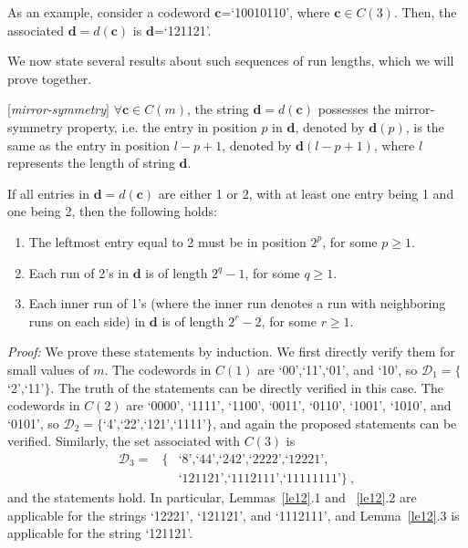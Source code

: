As an example, consider a codeword $\mathbf{c}$=`10010110', where
$\mathbf{c} \in C(3)$. Then, the associated
$\mathbf{d}=d(\mathbf{c})$ is $\mathbf{d}$=`121121'.

We now state several results about such
sequences of run lengths, which we will
prove together.

\begin{lemma}\label{le11} [\textit{mirror-symmetry}] $\forall \mathbf{c} \in C(m)$, the
string $\mathbf{d} = d(\mathbf{c})$
possesses the mirror-symmetry property, i.e.
the entry in position $p$ in $\mathbf{d}$, denoted by
$\mathbf{d}(p)$, is the same as the entry in position $l-p+1$,
denoted by $\mathbf{d}(l-p+1)$, where $l$ represents the length
of string $\mathbf{d}$.
\end{lemma}
\begin{lemma}\label{le12} If all entries in $\mathbf{d} = d(\mathbf{c})$ are either 1 or 2,
with at least one entry being 1 and one being 2, then the
following holds: \begin{enumerate} \item The leftmost entry equal
to 2 must be in position $2^p$, for some $p \geq 1$. \item Each
run of 2's in $\mathbf{d}$ is of length $2^q-1$, for some $q \geq
1$. \item Each inner run of 1's (where the inner run denotes a run
with neighboring runs on each side) in $\mathbf{d}$ is of length
$2^r-2$, for some $r \geq 1$.
\end{enumerate}
\end{lemma}
\noindent \textit{Proof:} We prove these statements by induction. We
first directly verify them for small values of $m$. The codewords in
$C(1)$ are `00',`11',`01', and `10', so
$\mathcal{D}_1=\{$`2',`11'$\}$. The truth of the statements can be
directly verified in this case. The codewords in $C(2)$ are `0000',
`1111', `1100', `0011', `0110', `1001', `1010', and `0101', so
\newline \noindent$\mathcal{D}_2=\{$`4',`22',`121',`1111'$\}$, and again the
proposed statements can be verified. Similarly, the set associated
with $C(3)$ is
\begin{eqnarray*}
\mathcal{D}_3=&\{&\text{`8',`44',`242',`2222',`12221'},\\
{}&{}&\text{`121121',`1112111',`11111111'}\}~,
\end{eqnarray*}
and the statements hold. In particular, Lemmas~\ref{le12}.1 and
~\ref{le12}.2 are applicable for the strings `12221', `121121',
and `1112111', and Lemma~\ref{le12}.3 is applicable for the string
`121121'.

